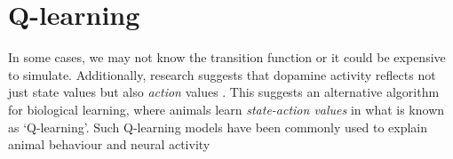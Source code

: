 \section{Q-learning}
\label{sec:q_learning}



In some cases, we may not know the transition function or it could be expensive to simulate.
Additionally, research suggests that dopamine activity reflects not just state values but also \emph{action} values \citep{roesch2007dopamine,morris2006midbrain}.
This suggests an alternative algorithm for biological learning, where animals learn \emph{state-action values} in what is known as `Q-learning'.
Such Q-learning models have been commonly used to explain animal behaviour and neural activity \citep{niv2009reinforcement, mattar2018prioritized}

